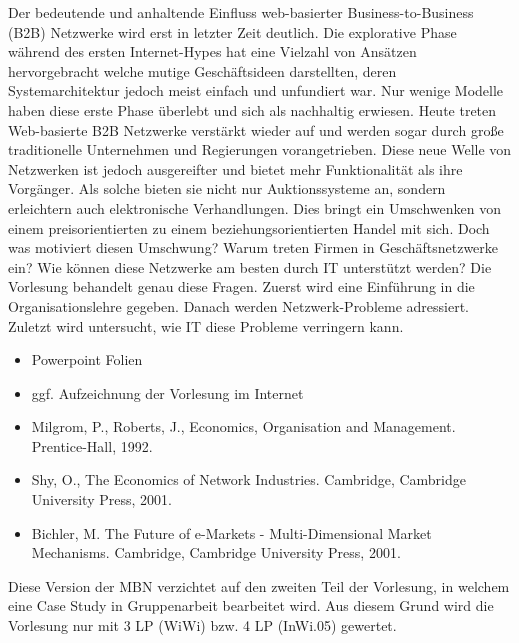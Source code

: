 \begin{course}
\begin{content}
Der bedeutende und anhaltende Einfluss web-basierter Business-to-Business (B2B) Netzwerke wird erst in letzter Zeit deutlich. Die explorative Phase während des ersten Internet-Hypes hat eine Vielzahl von Ansätzen hervorgebracht welche mutige Geschäftsideen darstellten, deren Systemarchitektur jedoch meist einfach und unfundiert war. Nur wenige Modelle haben diese erste Phase überlebt und sich als nachhaltig erwiesen. Heute treten Web-basierte B2B Netzwerke verstärkt wieder auf und werden sogar durch große traditionelle Unternehmen und Regierungen vorangetrieben. Diese neue Welle von Netzwerken ist jedoch ausgereifter und bietet mehr Funktionalität als ihre Vorgänger. Als solche bieten sie nicht nur Auktionssysteme an, sondern erleichtern auch elektronische Verhandlungen. Dies bringt ein Umschwenken von einem preisorientierten zu einem beziehungsorientierten Handel mit sich. Doch was motiviert diesen Umschwung? Warum treten Firmen in Geschäftsnetzwerke ein? Wie können diese Netzwerke am besten durch IT unterstützt werden? Die Vorlesung behandelt genau diese Fragen. Zuerst wird eine Einführung in die Organisationslehre gegeben. Danach werden Netzwerk-Probleme adressiert. Zuletzt wird untersucht, wie IT diese Probleme verringern kann.


\end{content}

\begin{media}\begin{itemize}\item Powerpoint Folien  \item ggf. Aufzeichnung der Vorlesung im Internet  \end{itemize}\end{media}

\begin{literature}\begin{itemize}\item Milgrom, P., Roberts, J., Economics, Organisation and Management. Prentice-Hall, 1992.  \item Shy, O., The Economics of Network Industries. Cambridge, Cambridge University Press, 2001.  \item Bichler, M. The Future of e-Markets - Multi-Dimensional Market Mechanisms. Cambridge, Cambridge University Press, 2001.  \end{itemize}\end{literature}

\begin{remarks}Diese Version der MBN verzichtet auf den zweiten Teil der Vorlesung, in welchem eine Case Study in Gruppenarbeit bearbeitet wird. Aus diesem Grund wird die Vorlesung nur mit 3 LP (WiWi) bzw. 4 LP (InWi.05) gewertet.

\end{remarks}

\end{course}
